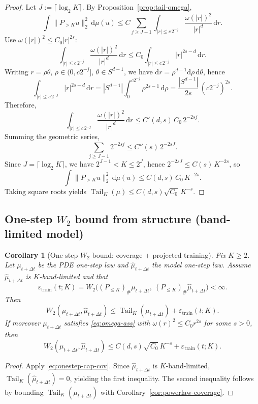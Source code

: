 \documentclass{article}
\numberwithin{equation}{section}
\theoremstyle{plain}
\newtheorem{corollary}[theorem]{Corollary}
\theoremstyle{definition}
\theoremstyle{remark}
\newcommand{\Tail}{\operatorname{Tail}}
\begin{document}
\begin{proof}
Let $J:=\lceil\log_2 K\rceil$. By Proposition~\ref{prop:tail-omega},
\[
\int\|P_{>K}u\|_2^2\,\mathrm{d}\mu(u)
\le
C\sum_{j\ge J-1}\int_{|r|\le c\,2^{-j}}\frac{\omega(|r|)^2}{|r|^d}\,\mathrm{d}r.
\]
Use $\omega(|r|)^2\le C_0 |r|^{2s}$:
\[
\int_{|r|\le c\,2^{-j}}\frac{\omega(|r|)^2}{|r|^d}\,\mathrm{d}r
\le
C_0\int_{|r|\le c\,2^{-j}}|r|^{2s-d}\,\mathrm{d}r.
\]
Writing $r=\rho\theta$, $\rho\in(0,c2^{-j}]$, $\theta\in S^{d-1}$, we have $\mathrm{d}r=\rho^{d-1}\mathrm{d}\rho\,\mathrm{d}\theta$, hence
\[
\int_{|r|\le c\,2^{-j}}|r|^{2s-d}\,\mathrm{d}r
=
|S^{d-1}|\int_0^{c2^{-j}}\rho^{2s-1}\,\mathrm{d}\rho
=
\frac{|S^{d-1}|}{2s}\,(c2^{-j})^{2s}.
\]
Therefore,
\[
\int_{|r|\le c\,2^{-j}}\frac{\omega(|r|)^2}{|r|^d}\,\mathrm{d}r
\le
C'(d,s)\,C_0\,2^{-2sj}.
\]
Summing the geometric series,
\[
\sum_{j\ge J-1}2^{-2sj}
\le C''(s)\,2^{-2sJ}.
\]
Since $J=\lceil\log_2 K\rceil$, we have $2^{J-1}<K\le 2^J$, hence $2^{-2sJ}\le C(s)\,K^{-2s}$, so
\[
\int\|P_{>K}u\|_2^2\,\mathrm{d}\mu(u)\le C(d,s)\,C_0\,K^{-2s}.
\]
Taking square roots yields $\Tail_K(\mu)\le C(d,s)\sqrt{C_0}\,K^{-s}$.
\end{proof}


\subsection{One-step $W_2$ bound from structure (band-limited model)}

\begin{corollary}[One-step $W_2$ bound: coverage + projected training]
\label{cor:onestep}
Fix $K\ge 2$. Let $\mu_{t+\Delta t}$ be the PDE one-step law and $\widehat\mu_{t+\Delta t}$ the model one-step law.
Assume $\widehat\mu_{t+\Delta t}$ is $K$-band-limited and that
\[
\varepsilon_{\mathrm{train}}(t;K)
=
W_2\big((P_{\le K})_\#\mu_{t+\Delta t},\ (P_{\le K})_\#\widehat\mu_{t+\Delta t}\big)
<\infty.
\]
Then
\[
W_2(\mu_{t+\Delta t},\widehat\mu_{t+\Delta t})
\le
\Tail_K(\mu_{t+\Delta t})+\varepsilon_{\mathrm{train}}(t;K).
\]
If moreover $\mu_{t+\Delta t}$ satisfies \eqref{eq:omega-ass} with $\omega(r)^2\le C_0 r^{2s}$ for some $s>0$,
then
\[
W_2(\mu_{t+\Delta t},\widehat\mu_{t+\Delta t})
\le
C(d,s)\sqrt{C_0}\,K^{-s}+\varepsilon_{\mathrm{train}}(t;K).
\]
\end{corollary}

\begin{proof}
Apply \eqref{eq:onestep-cap-cov}. Since $\widehat\mu_{t+\Delta t}$ is $K$-band-limited,
$\Tail_K(\widehat\mu_{t+\Delta t})=0$, yielding the first inequality.
The second inequality follows by bounding $\Tail_K(\mu_{t+\Delta t})$ with
Corollary~\ref{cor:powerlaw-coverage}.
\end{proof}
\end{document}
